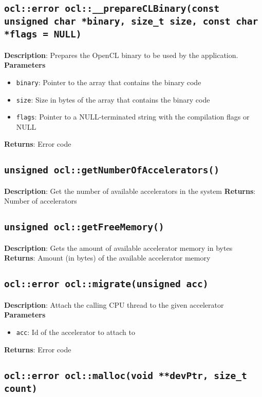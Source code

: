 \subsection{\texttt{ocl::error ocl::\_\_prepareCLBinary(const unsigned char *binary, size\_t size, 
const char *flags = NULL)}}

\textbf{Description}: Prepares the OpenCL binary to be used by the application.  \\
\textbf{Parameters}
\begin{itemize}
  \item \texttt{binary}: Pointer to the array that contains the binary code
  \item \texttt{size}: Size in bytes of the array that contains the binary code
  \item \texttt{flags}: Pointer to a NULL\hyp{}terminated string with the compilation flags or NULL
\end{itemize}
\textbf{Returns}: Error code

\subsection{\texttt{unsigned ocl::getNumberOfAccelerators()}}

\textbf{Description}: Get the number of available accelerators in the system
\textbf{Returns}: Number of accelerators

\subsection{\texttt{unsigned ocl::getFreeMemory()}}

\textbf{Description}: Gets the amount of available accelerator memory in bytes
\textbf{Returns}: Amount (in bytes) of the available accelerator memory

\subsection{\texttt{ocl::error ocl::migrate(unsigned acc)}}

\textbf{Description}: Attach the calling CPU thread to the given accelerator
\textbf{Parameters}
\begin{itemize}
  \item \texttt{acc}: Id of the accelerator to attach to
\end{itemize}
\textbf{Returns}: Error code

\subsection{\texttt{ocl::error ocl::malloc(void **devPtr, size\_t count)}}


